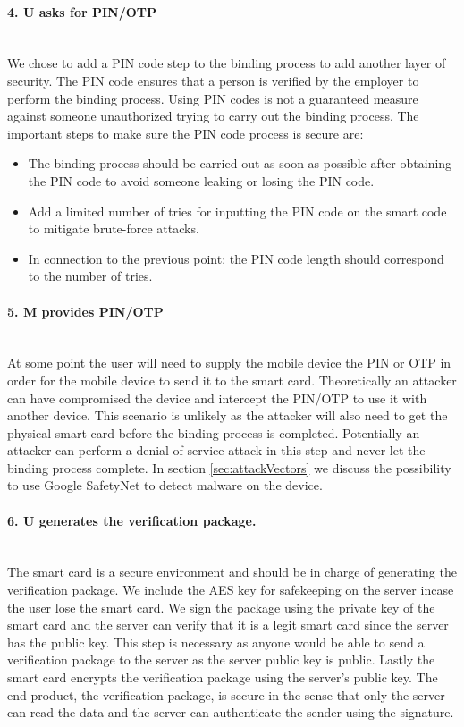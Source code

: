 \paragraph{4. U asks for PIN/OTP}\mbox{}\\
We chose to add a PIN code step to the binding process to add another layer of security. The PIN code ensures that a person is verified by the employer to perform the binding process. Using PIN codes is not a guaranteed measure against someone unauthorized trying to carry out the binding process. The important steps to make sure the PIN code process is secure are:
\begin{itemize}
  \item The binding process should be carried out as soon as possible after obtaining the PIN code to avoid someone leaking or losing the PIN code.
  \item Add a limited number of tries for inputting the PIN code on the smart code to mitigate brute-force attacks.
  \item In connection to the previous point; the PIN code length should correspond to the number of tries.
\end{itemize}

\paragraph{5. M provides PIN/OTP}\mbox{}\\
At some point the user will need to supply the mobile device the PIN or OTP in order for the mobile device to send it to the smart card. Theoretically an attacker can have compromised the device and intercept the PIN/OTP to use it with another device. This scenario is unlikely as the attacker will also need to get the physical smart card before the binding process is completed. Potentially an attacker can perform a denial of service attack in this step and never let the binding process complete. In section \ref{sec:attackVectors} we discuss the possibility to use Google SafetyNet to detect malware on the device.

\paragraph{6. U generates the verification package.}\mbox{}\\
The smart card is a secure environment and should be in charge of generating the verification package. We include the AES key for safekeeping on the server incase the user lose the smart card. We sign the package using the private key of the smart card and the server can verify that it is a legit smart card since the server has the public key. This step is necessary as anyone would be able to send a verification package to the server as the server public key is public. Lastly the smart card encrypts the verification package using the server's public key. The end product, the verification package, is secure in the sense that only the server can read the data and the server can authenticate the sender using the signature.

